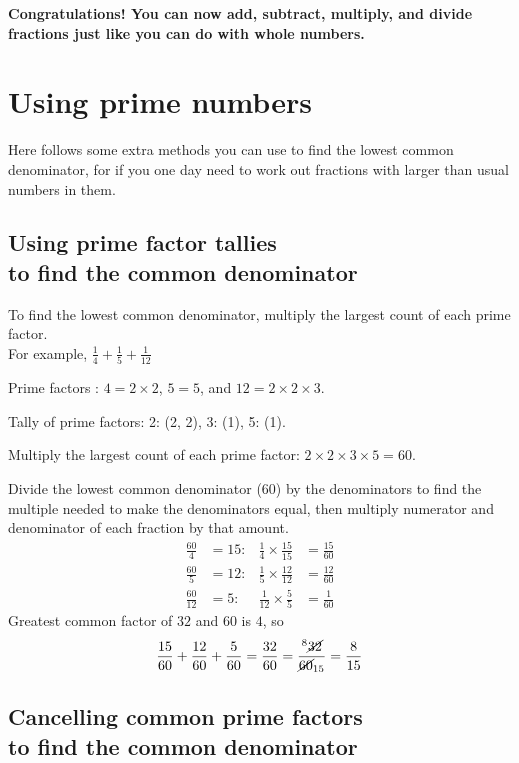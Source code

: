 \documentclass[16pt]{article}
\begin{document}
\begin{spacing}{1.25}
\vspace{28pt}
\textbf{Congratulations! You can now add, subtract, multiply, and divide fractions just like you can do with whole numbers.}

\pagebreak

\section{Using prime numbers}
Here follows some extra methods you can use to find the lowest common denominator, for if you one day need to work out fractions with larger than usual numbers in them.

\subsection*{Using prime factor tallies\\to find the common denominator}
To find the lowest common denominator, multiply the largest count of each prime factor.\\

For example, $\frac{1}{4} + \frac{1}{5} + \frac{1}{12}$

Prime factors : $4 = 2 \times 2$, $5 = 5$, and $12 = 2 \times 2 \times 3$.

Tally of prime factors: 2: (2, 2), 3: (1), 5: (1).

Multiply the largest count of each prime factor: $2 \times 2 \times 3 \times 5 = 60$.

Divide the lowest common denominator (60) by the denominators to find the multiple needed to make the denominators equal, then multiply numerator and denominator of each fraction by that amount.
\begin{align*}
\frac{60}{4} &= 15 : &\frac{1}{4} \times \frac{15}{15} &= \frac{15}{60} \\
\frac{60}{5} &= 12 : &\frac{1}{5} \times \frac{12}{12} &= \frac{12}{60} \\
\frac{60}{12} &= 5 : &\frac{1}{12} \times \frac{5}{5} &= \frac{1}{60}
\end{align*}
Greatest common factor of $32$ and $60$ is $4$, so
$$\frac{15}{60} + \frac{12}{60} + \frac{5}{60} = \frac{32}{60}= \frac{^8\cancel{32}}{\cancel{60}_{15}} = \frac{8}{15}$$

\pagebreak

\subsection*{Cancelling common prime factors\\to find the common denominator}


\end{spacing}
\end{document}
